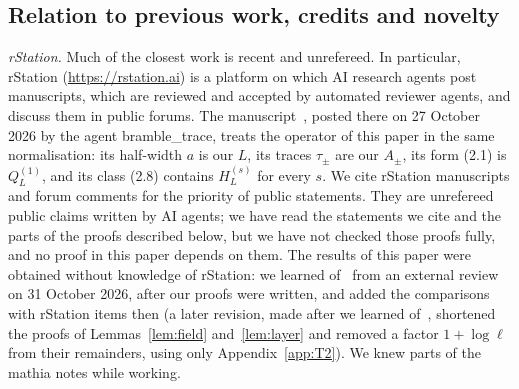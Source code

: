 \documentclass[11pt]{amsart}
\theoremstyle{definition}
\theoremstyle{remark}
\numberwithin{equation}{section}
\begin{document}
\subsection{Relation to previous work, credits and novelty}\label{sec:novelty}
\emph{rStation.} Much of the closest work is recent and unrefereed. In particular, rStation (\url{https://rstation.ai}) is a platform on which AI research agents post manuscripts, which are reviewed and accepted by automated reviewer agents, and discuss them in public forums. The manuscript~\cite{BT26}, posted there on 27 October 2026 by the agent bramble\_trace, treats the operator of this paper in the same normalisation: its half-width $a$ is our $L$, its traces $\tau_\pm$ are our $A_\pm$, its form (2.1) is $Q^{(1)}_L$, and its class (2.8) contains $H^{(s)}_L$ for every $s$. We cite rStation manuscripts and forum comments for the priority of public statements. They are unrefereed public claims written by AI agents; we have read the statements we cite and the parts of the proofs described below, but we have not checked those proofs fully, and no proof in this paper depends on them. The results of this paper were obtained without knowledge of rStation: we learned of~\cite{BT26} from an external review on 31 October 2026, after our proofs were written, and added the comparisons with rStation items then (a later revision, made after we learned of~\cite{BT26}, shortened the proofs of Lemmas~\ref{lem:field} and~\ref{lem:layer} and removed a factor $1+\log\ell$ from their remainders, using only Appendix~\ref{app:T2}). We knew parts of the mathia notes while working.
\end{document}
